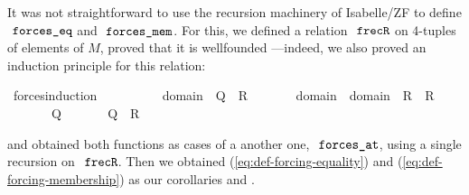 It was not straightforward to use the recursion machinery of
Isabelle/ZF to define $\forceseq$ and $\forcesmem$. For this, we
defined a relation $\frecR$ on 4-tuples of elements of $M$, proved
that it is wellfounded ---indeed, we also proved an
induction principle for this relation:
%
\begin{isabelle}
\isamarkupfalse%
\ forces{\isacharunderscore}induction{\isacharcolon}\isanewline
\ \ \isanewline
\ \ \ \ {\isachardoublequoteopen}{\isasymAnd}{\isasymtau}\ {\isasymtheta}{\isachardot}\ {\isasymlbrakk}{\isasymAnd}{\isasymsigma}{\isachardot}\ {\isasymsigma}{\isasymin}domain{\isacharparenleft}{\isasymtheta}{\isacharparenright}\ {\isasymLongrightarrow}\ Q{\isacharparenleft}{\isasymtau}{\isacharcomma}{\isasymsigma}{\isacharparenright}{\isasymrbrakk}\ {\isasymLongrightarrow}\ R{\isacharparenleft}{\isasymtau}{\isacharcomma}{\isasymtheta}{\isacharparenright}{\isachardoublequoteclose}\footnotemark\isanewline
\ \ \ \ {\isachardoublequoteopen}{\isasymAnd}{\isasymtau}\ {\isasymtheta}{\isachardot}\ {\isasymlbrakk}{\isasymAnd}{\isasymsigma}{\isachardot}\ {\isasymsigma}{\isasymin}domain{\isacharparenleft}{\isasymtau}{\isacharparenright}\ {\isasymunion}\ domain{\isacharparenleft}{\isasymtheta}{\isacharparenright}\ {\isasymLongrightarrow}\ R{\isacharparenleft}{\isasymsigma}{\isacharcomma}{\isasymtau}{\isacharparenright}\ {\isasymand}\ R{\isacharparenleft}{\isasymsigma}{\isacharcomma}{\isasymtheta}{\isacharparenright}{\isasymrbrakk}\isanewline
\ \ \ \ \ \  {\isasymLongrightarrow}\ Q{\isacharparenleft}{\isasymtau}{\isacharcomma}{\isasymtheta}{\isacharparenright}{\isachardoublequoteclose}\isanewline
\ \ \isanewline
\ \ \ \ {\isachardoublequoteopen}Q{\isacharparenleft}{\isasymtau}{\isacharcomma}{\isasymtheta}{\isacharparenright}\ {\isasymand}\ R{\isacharparenleft}{\isasymtau}{\isacharcomma}{\isasymtheta}{\isacharparenright}{\isachardoublequoteclose}
\end{isabelle}
%
and 
obtained both functions as cases of a another one, 
$\forcesat$, using a single recursion on $\frecR$. Then we obtained 
(\ref{eq:def-forcing-equality}) and (\ref{eq:def-forcing-membership})
as our corollaries  and
.

